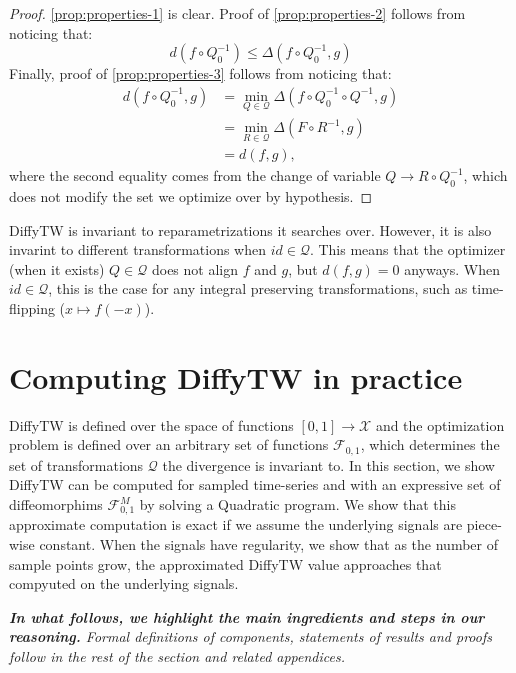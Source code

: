 \begin{proof} \cref{prop:properties-1} is clear. Proof of \cref{prop:properties-2} follows from noticing that:
\begin{equation}
d(f\circ Q_0^{-1}) \leq \Delta(f\circ Q_0^{-1}, g)
\end{equation}
Finally, proof of \cref{prop:properties-3} follows from noticing that:
\begin{align}
d(f \circ Q_0^{-1}, g) &= \min_{Q\in\mathcal Q}\Delta(f\circ Q_0^{-1} \circ Q^{-1}, g)\\
& = \min_{R\in\mathcal Q} \Delta(F\circ R^{-1}, g)\\
& = d(f, g),
\end{align} where the second equality comes from the change of variable $Q \to R \circ Q_0^{-1}$, which does not modify the set we optimize over by hypothesis.
\end{proof}

DiffyTW is invariant to reparametrizations it searches over. However, it is also invarint to different transformations when $id \in \mathcal Q$. This means that the optimizer (when it exists) $Q \in \mathcal Q$ does not align $f$ and $g$, but $d(f,g)=0$ anyways. When $id \in \mathcal Q$, this is the case for any integral preserving transformations, such as time-flipping ($x \mapsto f(-x)$).

\section{Computing DiffyTW in practice}\label{sec:computing-diffytw}
DiffyTW is defined over the space of functions $[0,1] \to \mathcal X$ and the optimization problem is defined over an arbitrary set of functions $\mathcal F_{0,1}$, which determines the set of transformations $\mathcal Q$ the divergence is invariant to. In this section, we show DiffyTW can be computed for sampled time-series and with an expressive set of diffeomorphims $\mathcal F_{0,1}^M$ by solving a Quadratic program. We show that this approximate computation is exact if we assume the underlying signals are piece-wise constant. When the signals have regularity, we show that as the number of sample points grow, the approximated DiffyTW value approaches that compyuted on the underlying signals.

\emph{\textbf{In what follows, we highlight the main ingredients and steps in our reasoning.} Formal definitions of components, statements of results and proofs follow in the rest of the section and related appendices.}

